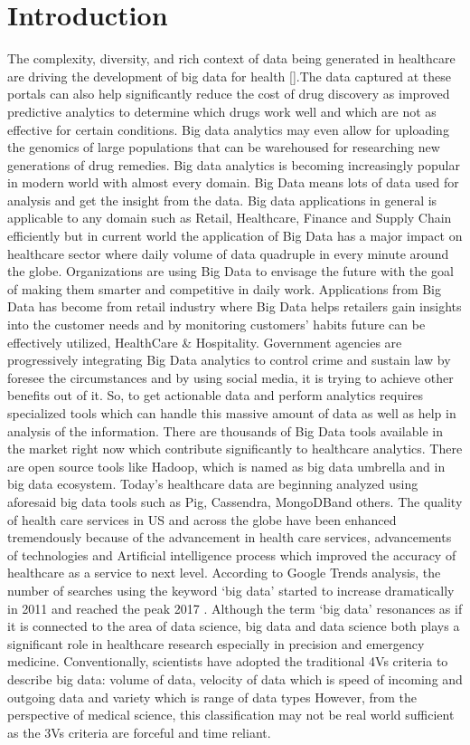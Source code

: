 \documentclass[sigconf]{acmart}
\begin{document}
\section{Introduction}
The complexity, diversity, and rich context of data being generated in healthcare
are driving the development of big data for health [\cite{editor02}].The data captured at these portals can also help significantly reduce the cost of drug discovery as improved predictive analytics to determine which drugs work well and which are not as effective for certain conditions. Big data analytics may even allow for uploading the genomics of large populations that can be warehoused for researching new generations of drug remedies. Big data analytics is becoming increasingly popular in modern world with almost every domain. Big Data means lots of data used for analysis and get the insight from the data. Big data applications in general is applicable to any domain such as Retail, Healthcare, Finance and Supply Chain efficiently but in current world the application of Big Data has a major impact on healthcare sector where daily volume of data quadruple in every minute around the globe. Organizations are using Big Data to envisage the future with the goal of making them smarter and competitive in daily work. Applications from Big Data has become from retail industry where Big Data helps retailers gain insights into the customer needs and by monitoring customers’ habits future can be effectively utilized, HealthCare & Hospitality\cite{editor02}. Government agencies are progressively integrating Big Data analytics to control crime and sustain law by foresee the circumstances and by using social media, it is trying to achieve other benefits out of it. So, to get actionable data and perform analytics requires specialized tools which can handle this massive amount of data as well as help in analysis of the information. There are thousands of Big Data tools available in the market right now which contribute significantly to healthcare analytics. There are open source tools like Hadoop, which is named as big data umbrella and in big data ecosystem. Today’s healthcare data are beginning analyzed using aforesaid big data tools such as Pig, Cassendra, MongoDBand others. The quality of health care services in US and across the globe have been enhanced tremendously because of the advancement in health care services, advancements of technologies and Artificial intelligence process which improved the accuracy of healthcare as a service to next level. According to Google Trends analysis, the number of searches using the keyword ‘big data’ started to increase dramatically in 2011 and reached the peak 2017 \cite{editor02}. Although the term ‘big data’ resonances as if it is connected to the area of data science,  big data and data science both plays a significant role in healthcare research especially in precision and emergency medicine. Conventionally, scientists have adopted the traditional 4Vs criteria to describe big data: volume of data, velocity of data which is speed of incoming and outgoing data and variety which is range of data types \cite{editor03} However, from the perspective of medical science, this classification may not be real world sufficient as the 3Vs criteria are forceful and time reliant.
\end{document}
